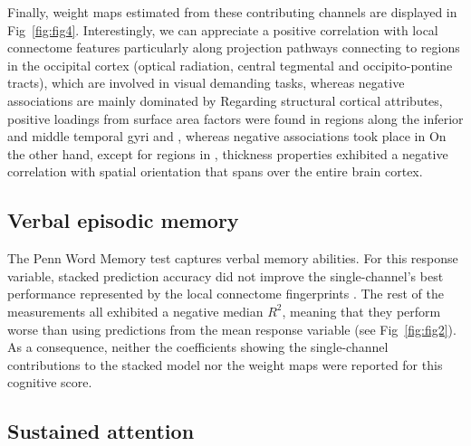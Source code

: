 \documentclass[10pt,letterpaper]{article}
\begin{document}
Finally, weight maps estimated from these contributing channels are displayed in Fig~\ref{fig:fig4}. Interestingly, we can appreciate a positive correlation with local connectome features particularly along  projection pathways connecting to regions in the occipital cortex (optical radiation, central tegmental and  occipito-pontine tracts), which are involved in visual demanding tasks, whereas negative associations are mainly dominated by  Regarding structural cortical attributes, positive loadings from surface area factors were found in regions along the inferior and middle temporal gyri and , whereas negative associations took place in  On the other hand, except for regions in , thickness properties exhibited a negative correlation with spatial orientation that spans over the entire brain cortex.

\subsection*{Verbal episodic memory}

The Penn Word Memory test captures verbal memory abilities. For this response variable, stacked prediction accuracy  did not improve the single-channel's best performance represented by the local connectome fingerprints . The rest of the measurements all exhibited a negative median $R^2$, meaning that they perform worse than using predictions from the mean response variable (see Fig~\ref{fig:fig2}).  As a consequence, neither the  coefficients showing the single-channel contributions to the stacked model nor the weight maps were reported for this cognitive score.

\subsection*{Sustained attention}
\end{document}
